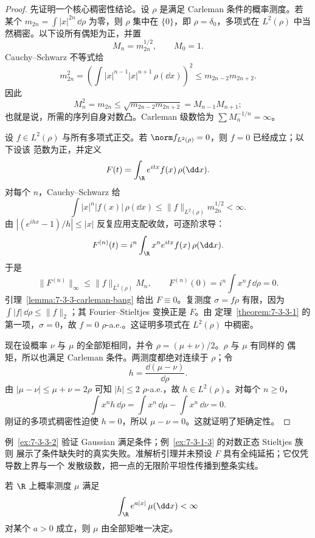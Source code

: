 \begin{proof}
先证明一个核心稠密性结论。设 $\rho$ 是满足 Carleman 条件的概率测度。若某个
$m_{2n}=\int|x|^{2n}\,\dd\rho$ 为零，则 $\rho$ 集中在 $\{0\}$，即 $\rho=\delta_0$，多项式在
$L^2(\rho)$ 中当然稠密。以下设所有偶矩为正，并置
\[
 M_n=m_{2n}^{1/2},\qquad M_0=1.
\]
Cauchy--Schwarz 不等式给
\[
 m_{2n}^2
 =\left(\int |x|^{n-1}|x|^{n+1}\,\rho(\dd x)\right)^2
 \leq m_{2n-2}m_{2n+2}.
\]
因此
\[
 M_n^2=m_{2n}
 \leq\sqrt{m_{2n-2}m_{2n+2}}=M_{n-1}M_{n+1};
\]
也就是说，所需的序列自身对数凸。Carleman 级数恰为
$\sum M_n^{-1/n}=\infty$。

设 $f\in L^2(\rho)$ 与所有多项式正交。若 $\norm f_{L^2(\rho)}=0$，则 $f=0$ 已经成立；以下设该
范数为正，并定义
\[
 F(t)=\int_\R e^{itx}f(x)\,\rho(\dd x).
\]
对每个 $n$，Cauchy--Schwarz 给
\[
 \int|x|^n|f(x)|\,\rho(\dd x)
 \leq\|f\|_{L^2(\rho)}m_{2n}^{1/2}<\infty.
\]
由 $|(e^{ihx}-1)/h|\leq|x|$ 反复应用支配收敛，可逐阶求导：
\[
 F^{(n)}(t)=i^n\int_\R x^ne^{itx}f(x)\,\rho(\dd x).
\]
于是
\[
 \|F^{(n)}\|_\infty
 \leq\|f\|_{L^2(\rho)}M_n,
 \qquad
 F^{(n)}(0)=i^n\int x^nf\,\dd\rho=0.
\]
引理~\ref{lemma:7-3-3-carleman-bang} 给出 $F\equiv0$。复测度
$\sigma=f\rho$ 有限，因为
$\int|f|\,\dd\rho\leq\|f\|_2$；其 Fourier--Stieltjes 变换正是 $F$。由
定理~\ref{theorem:7-3-3-1} 的第一项，$\sigma=0$，故 $f=0$ $\rho$-a.e.。这证明多项式在
$L^2(\rho)$ 中稠密。

现在设概率 $\nu$ 与 $\mu$ 的全部矩相同，并令 $\rho=(\mu+\nu)/2$。$\rho$ 与 $\mu$ 有同样的
偶矩，所以也满足 Carleman 条件。两测度都绝对连续于 $\rho$；令
\[
 h=\frac{\dd(\mu-\nu)}{\dd\rho}.
\]
由 $|\mu-\nu|\leq\mu+\nu=2\rho$ 可知 $|h|\leq2$ $\rho$-a.e.，故 $h\in L^2(\rho)$。对每个
$n\geq0$，
\[
 \int x^nh\,\dd\rho=\int x^n\,\dd\mu-\int x^n\,\dd\nu=0.
\]
刚证的多项式稠密性迫使 $h=0$，所以 $\mu-\nu=0$。这就证明了矩确定性。
\end{proof}

例~\ref{ex:7-3-3-2} 验证 Gaussian 满足条件；例~\ref{ex:7-3-1-3} 的对数正态 Stieltjes 族则
展示了条件缺失时的真实失败。准解析引理并未预设 $F$ 具有全纯延拓；它仅凭导数上界与一个
发散级数，把一点的无限阶平坦性传播到整条实线。

\begin{proposition}[指数矩蕴含确定性]\label{proposition:7-3-3-3}
若 $\R$ 上概率测度 $\mu$ 满足
\[
 \int_\R e^{a|x|}\,\mu(\dd x)<\infty
\]
对某个 $a>0$ 成立，则 $\mu$ 由全部矩唯一决定。
\end{proposition}

